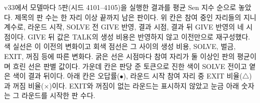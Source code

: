 \caption{v33에서 모델마다 5판(시드 4101--4105)을 실행한 결과를 평균 Sen 지수 순으로 놓았다. 제목의 판 수는 한 자리 이상 끝까지 남은 판이다. 위 칸은 참여 중인 자리들의 지니 계수로, 라운드 시작, SOLVE 전 GIVE 반영, 결과 시점, 결과 뒤 GIVE 반영의 네 시점이다. GIVE 뒤 값은 TALK의 생성 비용은 반영하지 않고 이전만으로 재구성했다. 색 실선은 이 이전의 변화이고 회색 점선은 그 사이의 생성 비용, SOLVE, 벌금, EXIT, 꺼짐 등에 따른 변화다. 굵은 선은 시점마다 참여 자리가 둘 이상인 판의 평균이며 흐린 선은 판별 값이다. 가운데 칸은 판당 준 토큰으로 진한 색이 SOLVE 전이고 옅은 색이 결과 뒤이다. 아래 칸은 오답률($\bullet$), 라운드 시작 참여 자리 중 EXIT 비율($\triangle$)과 꺼짐 비율($\times$)이다. EXIT와 꺼짐이 없는 라운드는 표시하지 않았고 눈금 아래 숫자는 그 라운드를 시작한 판 수다.}